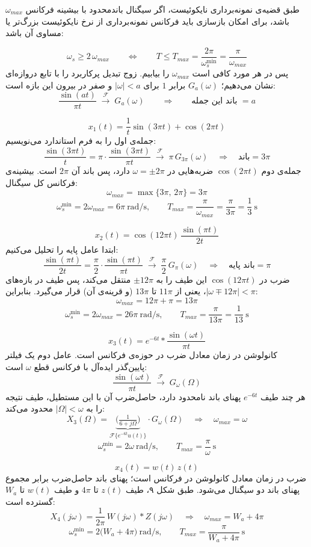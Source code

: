 طبق قضیه‌ی نمونه‌برداری نایکوئیست، اگر سیگنال باندمحدود با بیشینه فرکانس $\omega_{max}$ باشد، برای امکان بازسازی باید فرکانس نمونه‌برداری از نرخ نایکوئیست بزرگ‌تر یا مساوی آن باشد:

\[
\omega_s \geq 2\,\omega_{max}
\qquad\Longleftrightarrow\qquad
T \leq T_{max} = \frac{2\pi}{\omega_s^{\min}} = \frac{\pi}{\omega_{max}}
\]
پس در هر مورد کافی است $\omega_{max}$ را بیابیم. زوج تبدیل پرکاربرد را با تابع دروازه‌ای  نشان می‌دهیم؛ $G_a(\omega)$ برابر $1$ برای $|\omega| < a$ و صفر در بیرون این بازه است:
\[
\frac{\sin(a t)}{\pi t} \;\xrightarrow{\ \mathcal{F}\ }\; G_a(\omega)
\qquad\Longrightarrow\qquad
\text{باند این جمله } = a
\]


\[
x_1(t) = \frac{1}{t}\sin(3\pi t) + \cos(2\pi t)
\]
جمله‌ی اول را به فرم استاندارد می‌نویسیم:
\[
\frac{\sin(3\pi t)}{t} = \pi\cdot\frac{\sin(3\pi t)}{\pi t}
\;\xrightarrow{\ \mathcal{F}\ }\;
\pi\,G_{3\pi}(\omega)
\quad\Rightarrow\quad \text{باند} = 3\pi
\]
جمله‌ی دوم $\cos(2\pi t)$ ضربه‌هایی در $\omega = \pm 2\pi$ دارد، پس باند آن $2\pi$ است. بیشینه‌ی فرکانس کل سیگنال:
\[
\omega_{max} = \max\{3\pi,\,2\pi\} = 3\pi
\]
\[
\omega_s^{\min} = 2\omega_{max} = 6\pi \ \text{rad/s},
\qquad
T_{max} = \frac{\pi}{\omega_{max}} = \frac{\pi}{3\pi} = \frac{1}{3}\ \text{s}
\]


\[
x_2(t) = \cos(12\pi t)\,\frac{\sin(\pi t)}{2t}
\]
ابتدا عامل پایه را تحلیل می‌کنیم:
\[
\frac{\sin(\pi t)}{2t} = \frac{\pi}{2}\cdot\frac{\sin(\pi t)}{\pi t}
\;\xrightarrow{\ \mathcal{F}\ }\;
\frac{\pi}{2}\,G_{\pi}(\omega)
\quad\Rightarrow\quad \text{باند پایه} = \pi
\]
ضرب در $\cos(12\pi t)$ این طیف را به $\pm 12\pi$ منتقل می‌کند، پس طیف در بازه‌های $|\omega \mp 12\pi| < \pi$، یعنی از $11\pi$ تا $13\pi$ (و قرینه‌ی آن) قرار می‌گیرد. بنابراین:
\[
\omega_{max} = 12\pi + \pi = 13\pi
\]
\[
\omega_s^{\min} = 2\omega_{max} = 26\pi \ \text{rad/s},
\qquad
T_{max} = \frac{\pi}{13\pi} = \frac{1}{13}\ \text{s}
\]


\[
x_3(t) = e^{-6t} * \frac{\sin(\omega t)}{\pi t}
\]
کانولوشن در زمان معادل ضرب در حوزه‌ی فرکانس است. عامل دوم یک فیلتر پایین‌گذر ایده‌آل با فرکانس قطع $\omega$ است:
\[
\frac{\sin(\omega t)}{\pi t} \;\xrightarrow{\ \mathcal{F}\ }\; G_{\omega}(\Omega)
\]
هر چند طیف $e^{-6t}$ پهنای باند نامحدود دارد، حاصل‌ضرب آن با این مستطیل، طیف نتیجه را به $|\Omega| < \omega$ محدود می‌کند:
\[
X_3(\Omega) = \underbrace{\Big(\tfrac{1}{6+j\Omega}\Big)}_{\mathcal{F}\{e^{-6t}u(t)\}}\cdot G_{\omega}(\Omega)
\quad\Rightarrow\quad
\omega_{max} = \omega
\]
\[
\omega_s^{\min} = 2\omega \ \text{rad/s},
\qquad
T_{max} = \frac{\pi}{\omega}\ \text{s}
\]


\[
x_4(t) = w(t)\,z(t)
\]
ضرب در زمان معادل کانولوشن در فرکانس است؛ پهنای باند حاصل‌ضرب برابر مجموع پهنای باند دو سیگنال می‌شود. طبق شکل ۹، طیف $z(t)$ تا $4\pi$ و طیف $w(t)$ تا $W_a$ گسترده است:
\[
X_4(j\omega) = \frac{1}{2\pi}\,W(j\omega) * Z(j\omega)
\quad\Rightarrow\quad
\omega_{max} = W_a + 4\pi
\]
\[
\omega_s^{\min} = 2\big(W_a + 4\pi\big) \ \text{rad/s},
\qquad
T_{max} = \frac{\pi}{W_a + 4\pi}\ \text{s}
\]

